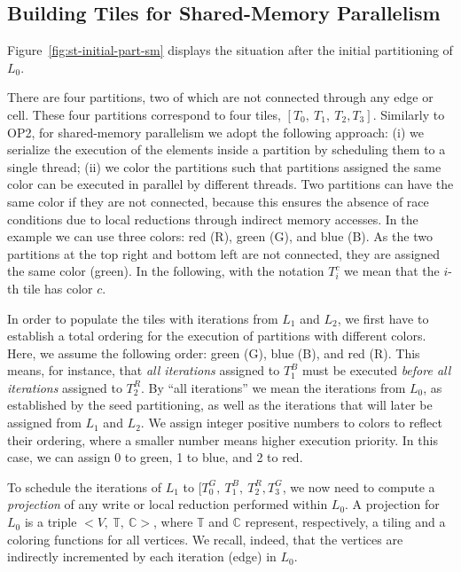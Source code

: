 \subsection*{Building Tiles for Shared-Memory Parallelism}
Figure~\ref{fig:st-initial-part-sm} displays the situation after the initial partitioning of $L_0$. 

There are four partitions, two of which are not connected through any edge or cell. These four partitions correspond to four tiles, $[T_0,\ T_1,\ T_2, T_3]$. Similarly to OP2, for shared-memory parallelism we adopt the following approach: (i) we serialize the execution of the elements inside a partition by scheduling them to a single thread; (ii) we color the partitions such that partitions assigned the same color can be executed in parallel by different threads. Two partitions can have the same color if they are not connected, because this ensures the absence of race conditions due to local reductions through indirect memory accesses. In the example we can use three colors: red (R), green (G), and blue (B). As the two partitions at the top right and bottom left are not connected, they are assigned the same color (green). In the following, with the notation $T_i^c$ we mean that the $i$-th tile has color $c$.

In order to populate the tiles with iterations from $L_1$ and $L_2$, we first have to establish a total ordering for the execution of partitions with different colors. Here, we assume the following order: green (G), blue (B), and red (R). This means, for instance, that \textit{all iterations} assigned to $T_1^B$ must be executed \textit{before all iterations} assigned to $T_2^R$. By ``all iterations'' we mean the iterations from $L_0$, as established by the seed partitioning, as well as the iterations that will later be assigned from $L_1$ and $L_2$. We assign integer positive numbers to colors to reflect their ordering, where a smaller number means higher execution priority. In this case, we can assign 0 to green, 1 to blue, and 2 to red.

To schedule the iterations of $L_1$ to $[T_0^G,\ T_1^B,\ T_2^R, T_3^G$, we now need to compute a \textit{projection} of any write or local reduction performed within $L_0$.  A projection for $L_0$ is a triple ${<}V,\ \mathbb{T},\ \mathbb{C}{>}$, where $\mathbb{T}$ and $\mathbb{C}$ represent, respectively, a tiling and a coloring functions for all vertices. We recall, indeed, that the vertices are indirectly incremented by each iteration (edge) in $L_0$. 

